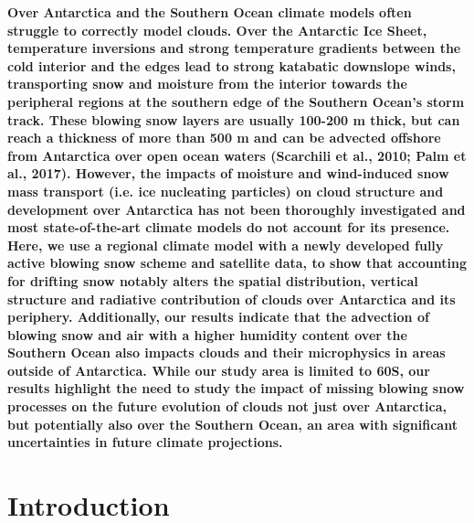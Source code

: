 \documentclass[12pt]{article}
\begin{document}
\textbf{Over Antarctica and the Southern Ocean climate models often struggle to correctly model clouds. Over the Antarctic Ice Sheet, temperature inversions and strong temperature gradients between the cold interior and the edges lead to strong katabatic downslope winds, transporting snow and moisture from the interior towards the peripheral regions at the southern edge of the Southern Ocean’s storm track. These blowing snow layers are usually 100-200 m thick, but can reach a thickness of more than 500 m and can be advected offshore from Antarctica over open ocean waters (Scarchili et al., 2010; Palm et al., 2017). However, the impacts of moisture and wind-induced snow mass transport (i.e. ice nucleating particles) on cloud structure and development over Antarctica has not been thoroughly investigated and most state-of-the-art climate models do not account for its presence. Here, we use a regional climate model with a newly developed fully active blowing snow scheme and satellite data, to show that accounting for drifting snow notably alters the spatial distribution, vertical structure and radiative contribution of clouds over Antarctica and its periphery. Additionally, our results indicate that the advection of blowing snow and air with a higher humidity content over the Southern Ocean also impacts clouds and their microphysics in areas outside of Antarctica. While our study area is limited to 60S, our results highlight the need to study the impact of missing blowing snow processes on the future evolution of clouds not just over Antarctica, but potentially also over the Southern Ocean, an area with significant uncertainties in future climate projections.}


%
\section*{Introduction} 
\end{document}
